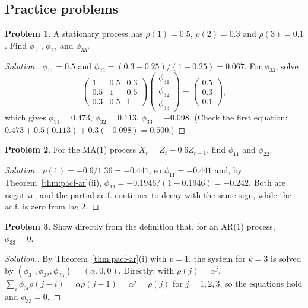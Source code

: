 \documentclass[11pt,a4paper]{article}
\theoremstyle{definition}
\newtheorem{problemx}{Problem}[subsection]
\newenvironment{problem}{\begin{problemx}}{\end{problemx}}
\newenvironment{solution}
  {\renewcommand{\qedsymbol}{}\begin{proof}[\textit{Solution}.]}
  {\end{proof}}
\begin{document}
\subsection{Practice problems}
\begin{problem}\label{prob:pacf-calc}
A stationary process has $\rho(1) = 0.5$, $\rho(2) = 0.3$ and $\rho(3) = 0.1$. Find $\phi_{11}$, $\phi_{22}$ and $\phi_{33}$.
\end{problem}

\begin{solution}
$\phi_{11} = 0.5$ and $\phi_{22} = (0.3 - 0.25)/(1 - 0.25) = 0.067$. For $\phi_{33}$, solve
\[
\begin{pmatrix} 1 & 0.5 & 0.3 \\ 0.5 & 1 & 0.5 \\ 0.3 & 0.5 & 1 \end{pmatrix}\begin{pmatrix} \phi_{31} \\ \phi_{32} \\ \phi_{33} \end{pmatrix} = \begin{pmatrix} 0.5 \\ 0.3 \\ 0.1 \end{pmatrix} ,
\]
which gives $\phi_{31} = 0.473$, $\phi_{32} = 0.113$, $\phi_{33} = -0.098$. (Check the first equation: $0.473 + 0.5(0.113) + 0.3(-0.098) = 0.500$.)
\end{solution}

\begin{problem}\label{prob:pacf-ma1}
For the MA(1) process $X_t = Z_t - 0.6Z_{t-1}$, find $\phi_{11}$ and $\phi_{22}$.
\end{problem}

\begin{solution}
$\rho(1) = -0.6/1.36 = -0.441$, so $\phi_{11} = -0.441$ and, by Theorem~\ref{thm:pacf-ar}(ii), $\phi_{22} = -0.1946/(1 - 0.1946) = -0.242$. Both are negative, and
the partial ac.f. continues to decay with the same sign, while the ac.f. is zero from lag $2$.
\end{solution}

\begin{problem}\label{prob:pacf-ar1}
Show directly from the definition that, for an AR(1) process, $\phi_{33} = 0$.
\end{problem}

\begin{solution}
By Theorem~\ref{thm:pacf-ar}(i) with $p = 1$, the system for $k = 3$ is solved by $(\phi_{31}, \phi_{32}, \phi_{33}) = (\alpha, 0, 0)$. Directly: with $\rho(j) = \alpha^j$,
$\sum_i\phi_{3i}\rho(j - i) = \alpha\rho(j - 1) = \alpha^j = \rho(j)$ for $j = 1, 2, 3$, so the equations hold and $\phi_{33} = 0$.
\end{solution}
\end{document}
